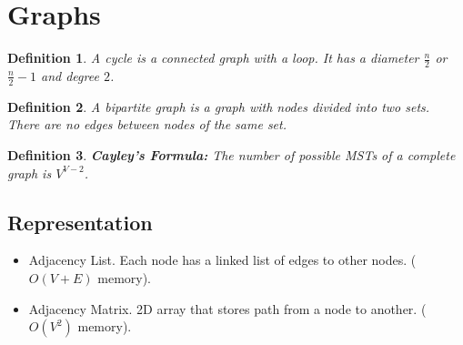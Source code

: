 \documentclass[10pt,landscape,a4paper]{article}
\newtheorem{definition}{Definition}[section]
\begin{document}
\begin{multicols*}{4}
\begin{itemize}
\end{itemize}

\section{Graphs}
\begin{definition}
    A cycle is a connected graph with a loop. It has a diameter $\frac{n}{2}$ or $\frac{n}{2}-1$ and degree $2$.
\end{definition}
\begin{definition}
    A bipartite graph is a graph with nodes divided into two sets. There are no edges between nodes of the same set.
\end{definition}
\begin{definition}
    \textbf{Cayley's Formula:} The number of possible MSTs of a complete graph is $V^{V-2}$.
\end{definition}

\subsection{Representation}
\begin{itemize}
    \item Adjacency List. Each node has a linked list of edges to other nodes. ($O(V+E)$ memory).
    \item Adjacency Matrix. 2D array that stores path from a node to another. ($O(V^2)$ memory).
\end{itemize}


\end{multicols*}
\end{document}
